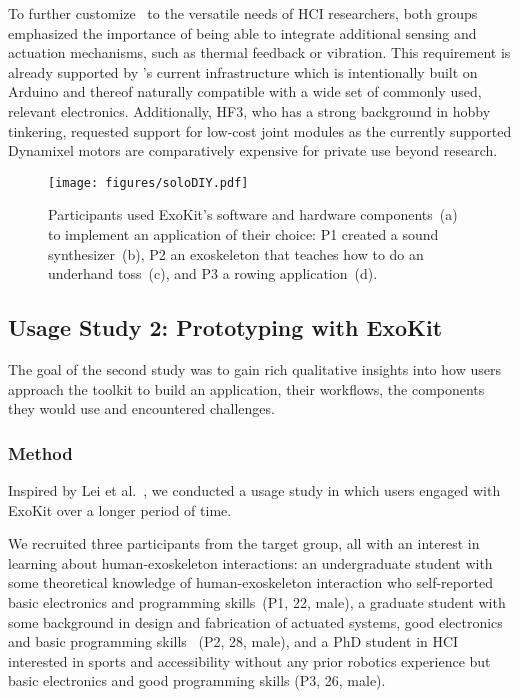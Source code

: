 To further customize \toolkit~to the versatile needs of HCI researchers, both groups emphasized the importance of being able to integrate additional sensing and actuation mechanisms, such as thermal feedback or vibration. This requirement is already supported by \toolkit's current infrastructure which is intentionally built on Arduino and thereof naturally compatible with a wide set of commonly used, relevant electronics. Additionally, HF3, who has a strong background in hobby tinkering, requested support for low-cost joint modules as the currently supported Dynamixel motors are comparatively expensive for private use beyond research.



\begin{figure*}[t]
    \centering
    \texttt{[image: figures/soloDIY.pdf]}
    \caption{Participants used ExoKit's software and hardware components~(a) to implement an application of their choice: 
    P1 created a sound synthesizer~(b), P2 an exoskeleton that teaches how to do an underhand toss~(c), and P3 a rowing application~(d).}
    \label{fig:solodiy}
\end{figure*}

\subsection{Usage Study 2: Prototyping with ExoKit}

The goal of the second study was to gain rich qualitative insights into how users approach the toolkit to build an application, their workflows, the components they would use and encountered challenges.

\subsubsection{Method}
Inspired by Lei et al.~\cite{lei_2022}, we conducted a usage study in which users engaged with ExoKit over a longer period of time. 

 We recruited three participants from the target group, all with an interest in learning about human-exoskeleton interactions: an undergraduate student with some theoretical knowledge of human-exoskeleton interaction who self-reported basic electronics and programming skills~(P1, 22, male), a graduate student with some background in design and fabrication of actuated systems, good electronics and basic programming skills ~(P2, 28, male), and a PhD student in HCI interested in sports and accessibility without any prior robotics experience but basic electronics and good programming skills (P3, 26, male).

